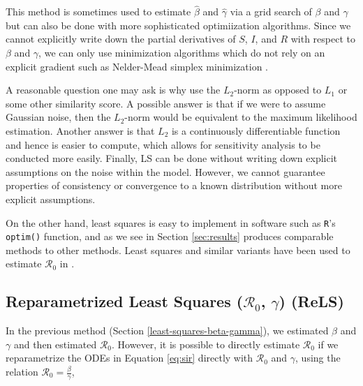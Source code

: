 \documentclass[12pt]{article}
\newcommand{\rr}{\ensuremath{\mathcal{R}_0}}
\begin{document}
This method is sometimes used to estimate $\hat{\beta}$ and $\hat{\gamma}$ via a grid search of $\beta$ and $\gamma$ but can also be done with more sophisticated optimiization algorithms.  Since we cannot explicitly write down the partial derivatives of $S$, $I$, and $R$ with respect to $\beta$ and $\gamma$, we can only use minimization algorithms which do not rely on an explicit gradient such as Nelder-Mead simplex minimization \citep{nelder-mead1965}.

A reasonable question one may ask is why use the $L_2$-norm as opposed to $L_1$ or some other similarity score.  A possible answer is that if we were to assume Gaussian noise, then the $L_2$-norm would be equivalent to the maximum likelihood estimation.  Another answer is that $L_2$ is a continuously differentiable function and hence is easier to compute, which allows for sensitivity analysis to  be conducted more easily.  Finally, LS can be done without writing down explicit assumptions on the noise within the model.  However, we cannot guarantee properties of consistency or convergence to a known distribution without more explicit assumptions.  

On the other hand, least squares is easy to implement in software such as \texttt{R}'s \texttt{optim()} function, and as we see in Section \ref{sec:results} produces comparable methods to other methods.  Least squares and similar variants have been used to estimate $\rr$ in \cite{majumder2016}.

\subsection{Reparametrized Least Squares ($\rr$, $\gamma$) (ReLS)}\label{reparametrized-least-squares-rux5f0-gamma}

In the previous method (Section \ref{least-squares-beta-gamma}), we estimated $\beta$ and $\gamma$ and then estimated $\rr$.  However, it is possible to directly estimate $\rr$ if we reparametrize the ODEs in Equation \eqref{eq:sir} directly with \(\rr\) and \(\gamma\), using the relation $\rr = \frac{\beta}{\gamma}$,
\end{document}

